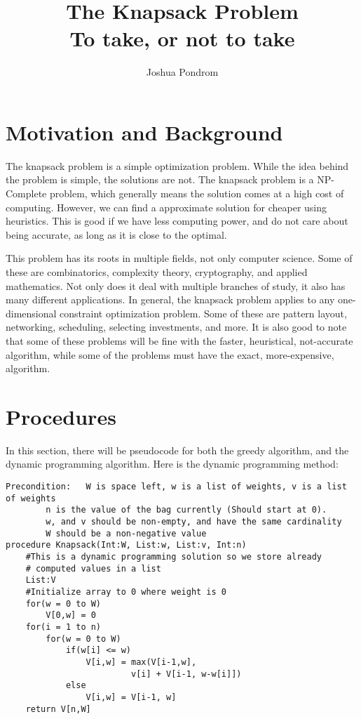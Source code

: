 \documentclass{article}
\begin{document}
\title{The Knapsack Problem\\\large To take, or not to take}
\author{Joshua Pondrom}
\maketitle

\section{Motivation and Background}
The knapsack problem is a simple optimization problem. While the idea behind
the problem is simple, the solutions are not. The knapsack problem is a 
NP-Complete problem, which generally means the solution comes at a high cost
of computing. However, we can find a approximate solution for cheaper using
heuristics. This is good if we have less computing power, and do not care
about being accurate, as long as it is close to the optimal.

This problem has its roots in multiple fields, not only computer science. Some 
of these are combinatorics, complexity theory, cryptography, and applied
mathematics. Not only does it deal with multiple branches of study, it also has
many different applications. In general, the knapsack problem applies to any
one-dimensional constraint optimization problem. Some of these are pattern
layout, networking, scheduling, selecting investments, and more. It is also
good to note that some of these problems will be fine with the faster, 
heuristical, not-accurate algorithm, while some of the problems must have
the exact, more-expensive, algorithm.
\section{Procedures}
In this section, there will be pseudocode for both the greedy algorithm, and the
dynamic programming algorithm. Here is the dynamic programming method:
\newpage
\begin{lstlisting}
Precondition:	W is space left, w is a list of weights, v is a list of weights
		n is the value of the bag currently (Should start at 0).
		w, and v should be non-empty, and have the same cardinality
		W should be a non-negative value
procedure Knapsack(Int:W, List:w, List:v, Int:n)
	#This is a dynamic programming solution so we store already
	# computed values in a list
	List:V
	#Initialize array to 0 where weight is 0
	for(w = 0 to W) 
		V[0,w] = 0
	for(i = 1 to n)
		for(w = 0 to W)
			if(w[i] <= w)
				V[i,w] = max(V[i-1,w], 
					     v[i] + V[i-1, w-w[i]])
			else
				V[i,w] = V[i-1, w]
	return V[n,W]
\end{lstlisting}
\end{document}
